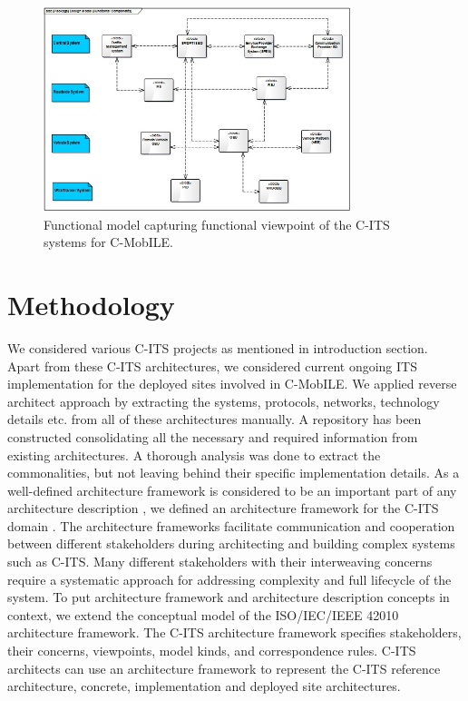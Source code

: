 \documentclass[conference]{IEEEtran}
\begin{document}
\begin{figure}[!t]
  \centering
  \includegraphics[width=0.8\textwidth]{functional_vp}
  \caption{Functional model capturing functional viewpoint of the C-ITS systems for C-MobILE.}
  \label{functional}
  \centering

\end{figure}


\section{Methodology}

We considered various C-ITS projects as mentioned in introduction section.
Apart from these C-ITS architectures, we considered current ongoing ITS implementation for the deployed sites involved in C-MobILE.
We applied reverse architect approach by extracting the systems, protocols, networks, technology details etc.
from all of these architectures manually.
A repository has been constructed consolidating all the necessary and required information from existing architectures.
A thorough analysis was done to extract the commonalities, but not leaving behind their specific implementation details.
As a well-defined architecture framework is considered to be an important part of any architecture description \cite{archframework}, we defined an architecture framework for the C-ITS domain \cite{ITSCongress}.
The architecture frameworks facilitate communication and cooperation between different stakeholders during architecting and building complex systems such as C-ITS.
Many different stakeholders with their interweaving concerns require a systematic approach for addressing complexity and full lifecycle of the system.
To put architecture framework and architecture description concepts in context, we extend the conceptual model of the ISO/IEC/IEEE 42010\cite{iso42010} architecture framework.
The C-ITS architecture framework specifies stakeholders, their concerns, viewpoints, model kinds, and correspondence rules.
C-ITS architects can use an architecture framework to represent the C-ITS reference architecture, concrete, implementation and deployed site architectures.
\end{document}
